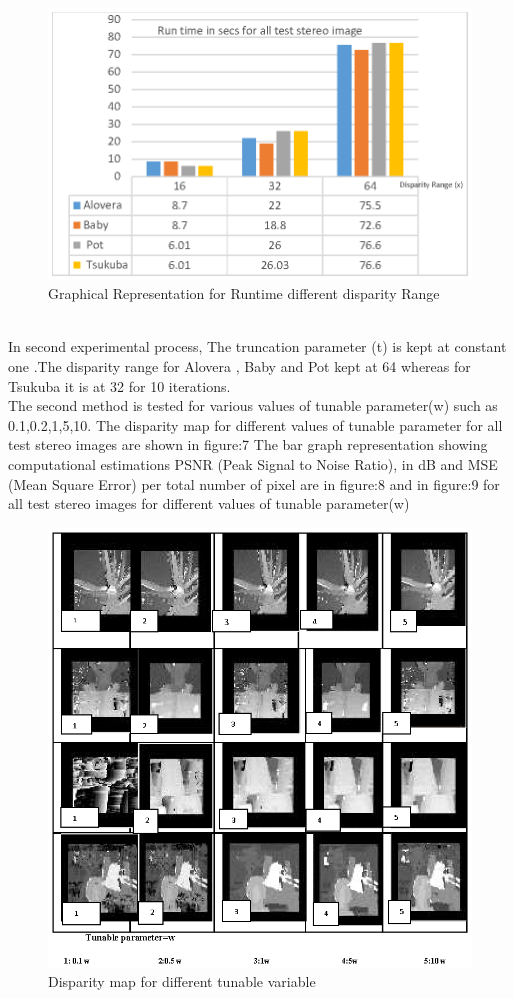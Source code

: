 \documentclass{singlecol-new}
\theoremstyle{TH}{
\newtheorem{lemma}{Lemma}
\newtheorem{theorem}[lemma]{Theorem}
\newtheorem{corrolary}[lemma]{Corrolary}
\newtheorem{conjecture}[lemma]{Conjecture}
\newtheorem{proposition}[lemma]{Proposition}
\newtheorem{claim}[lemma]{Claim}
\newtheorem{stheorem}[lemma]{Wrong Theorem}
\newtheorem{algorithm}{Algorithm}
}
\theoremstyle{THrm}{
\newtheorem{definition}{Definition}[section]
\newtheorem{question}{Question}[section]
\newtheorem{remark}{Remark}
\newtheorem{scheme}{Scheme}
}
\theoremstyle{THhit}{
\newtheorem{case}{Case}[section]
}
\begin{document}
 \begin{figure}
\includegraphics{runtime.eps}
\caption{Graphical Representation for Runtime different disparity Range}\label{fig:editpublish}
\end{figure} \\In second experimental process, The truncation parameter (t) is kept at constant one .The disparity range for Alovera , Baby and Pot kept at 64 whereas for Tsukuba it is at 32 for 10 iterations.\\The second method   is  tested for various values of tunable parameter(w) such as 0.1,0.2,1,5,10. The disparity map for different values of tunable parameter for all test stereo images are shown in figure:7 The bar graph representation  showing    computational estimations  PSNR (Peak Signal to Noise Ratio),  in dB and MSE (Mean Square Error) per total number of pixel are  in figure:8   and in figure:9 for all test stereo images for different values of  tunable parameter(w)
\begin{figure}
\includegraphics{differentw.eps}
\caption{Disparity map for different tunable variable}\label{fig:editpublish}
\end{figure}
\end{document}
